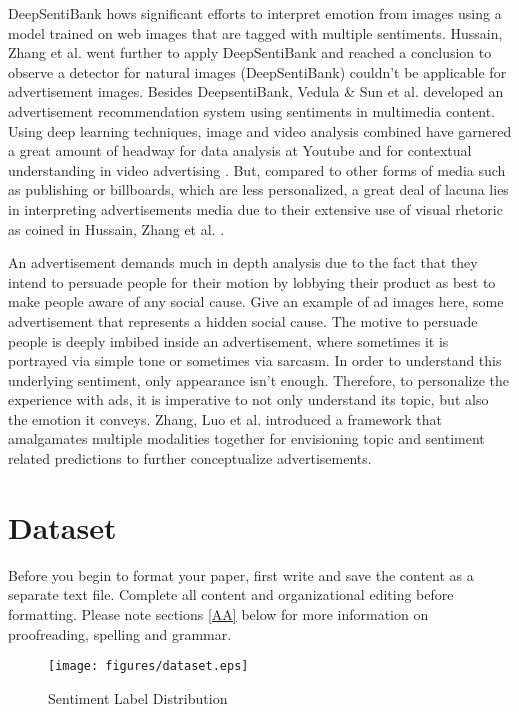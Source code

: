\documentclass[conference]{IEEEtran}
\begin{document}
DeepSentiBank \cite{b10} hows significant efforts to interpret emotion from images using a model trained on web images that are tagged with multiple sentiments. Hussain, Zhang et al.
\cite{b11} went further to apply DeepSentiBank and reached a conclusion to observe a detector for natural images (DeepSentiBank) couldn’t be applicable for advertisement images. Besides DeepsentiBank, Vedula \& Sun et al. \cite{b12} developed an advertisement recommendation system using sentiments in multimedia content. Using deep learning techniques, image and video analysis combined have garnered a great amount of headway for data analysis at Youtube and for contextual understanding in video advertising \cite{b13}.
But, compared to other forms of media such as publishing or billboards, which are less personalized, a great deal of lacuna lies in interpreting advertisements media due to their extensive use of visual rhetoric as coined in Hussain, Zhang et al. \cite{b11}. 

An advertisement demands much in depth analysis due to the fact that they intend to persuade people for their motion by lobbying their product as best to make people aware of any social cause. Give an example of ad images here, some advertisement that represents a hidden social cause. The motive to persuade people is deeply imbibed inside an advertisement, where sometimes it is portrayed via simple tone or sometimes via sarcasm. In order to understand this underlying sentiment, only appearance isn’t enough. Therefore, to personalize the experience with ads, it is imperative to  not only understand its topic, but also the emotion it conveys. Zhang, Luo et al. \cite{b14} introduced a framework that amalgamates multiple modalities together for envisioning topic and sentiment related predictions to further conceptualize advertisements.

\section{Dataset}
Before you begin to format your paper, first write and save the content as a 
separate text file. Complete all content and organizational editing before 
formatting. Please note sections \ref{AA} below for more information on 
proofreading, spelling and grammar.

\begin{figure}[htbp]
\texttt{[image: figures/dataset.eps]}
\caption{Sentiment Label Distribution}
\label{fig}
\end{figure}
\end{document}
